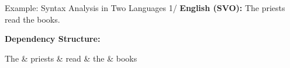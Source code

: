 \documentclass{beamer}
\begin{document}
\begin{frame}{Example: Syntax Analysis in Two Languages 1/}
    \textbf{English (SVO):} The priests read the books.\\

    \vspace{0.5cm}
\fboxsep=0pt
%
\hfill{%
\begin{minipage}[t]{0.42\linewidth}
\textbf{Dependency Structure:}

    \begin{dependency}[theme=night]
        \begin{deptext}
            The \& priests \& read \& the \& books \\
        \end{deptext}
    \end{dependency}
\end{minipage}
}
\end{frame}
\end{document}
